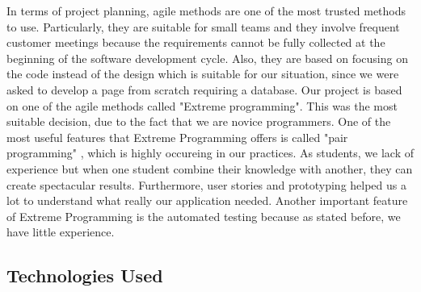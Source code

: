 \documentclass{l3proj}
\begin{document}
In terms of project planning, agile methods are one of the most trusted methods to use. Particularly, they are suitable for small teams and they involve frequent customer meetings because the requirements cannot be fully collected at the beginning of the software development cycle. Also, they are based on focusing on the code instead of the design which is suitable for our situation, since we were asked to develop a page from scratch requiring a database. Our project is based on one of the agile methods called "Extreme programming". This was the most suitable decision, due to the fact that we are novice programmers. One of the most useful features that Extreme Programming offers is called "pair programming" , which is highly occureing in our practices. As students, we lack of experience but when one student combine their knowledge with another, they can create spectacular results. Furthermore, user stories and prototyping helped us a lot to understand what really our application needed. Another important feature of Extreme Programming is the automated testing because as stated before, we have little experience.

\subsection{Technologies Used}
\label{tech}
\end{document}
